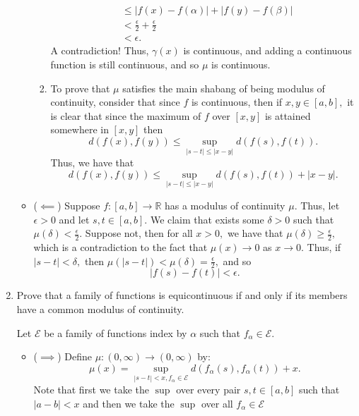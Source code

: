 \documentclass[11pt]{article}
\newcommand{\bbR}{\mathbb{R}}
\begin{document}
\begin{enumerate}
\begin{solution}
\begin{itemize}
\begin{enumerate}
\begin{align*}
              &\leq |f(x) - f(\alpha)| + |f(y) - f(\beta)|\\
              &< \frac{\epsilon}{2} + \frac{\epsilon}{2}\\
              &< \epsilon.
            \end{align*}
            A contradiction! Thus, $\gamma(x)$ is continuous, and adding a continuous function is still continuous, and so $\mu$ is continuous.
            \item To prove that $\mu$ satisfies the main shabang of being modulus of continuity, consider that since $f$ is continuous, then if $x,y \in [a,b],$ it is clear that since the maximum of $f$ over $[x,y]$ is attained somewhere in $[x,y]$ then
            \[d(f(x), f(y)) \leq \sup_{|s-t|\leq |x-y|}d(f(s), f(t)).\] Thus, we have that 
            \[d(f(x), f(y)) \leq \sup_{|s-t|\leq |x-y|}d(f(s), f(t)) + |x-y|.\] 
            \end{enumerate}
            \item ($\impliedby$) Suppose $f:[a,b] \to \bbR$ has a modulus of continuity $\mu.$ Thus, let $\epsilon>0$ and let $s,t \in [a,b].$ We claim that exists some $\delta >0$ such that $\mu(\delta) < \frac{\epsilon}{2}.$ Suppose not, then for all $x>0,$ we have that $\mu(\delta)\geq \frac{\epsilon}{2},$ which is a contradiction to the fact that $\mu(x) \to 0$ as $x\to 0.$ Thus, if $|s-t|<\delta,$ then $\mu(|s-t|)<\mu(\delta) = \frac{\epsilon}{2},$ and so 
            \[|f(s) - f(t)| < \epsilon.\]
        \end{itemize}
    \end{solution}
    \item 
    \begin{problem}
        Prove that a family of functions is equicontinuous if and only if its members
 have a common modulus of continuity.
    \end{problem}
    \begin{solution}
    Let $\mathcal{E}$ be a family of functions index by $\alpha$ such that $f_\alpha \in \mathcal{E}.$
        \begin{itemize}
            \item ($\implies$)  Define $\mu:(0,\infty) \to (0, \infty)$ by:
            \[\mu(x) = 
                \sup\limits_{|s-t|<x, f_\alpha \in \mathcal{E}}d(f_\alpha(s), f_\alpha(t)) + x.\] Note that first we take the $\sup$ over every pair $s,t \in [a,b]$ such that $|a-b|< x$ and then we take the $\sup$ over all $f_\alpha \in \mathcal{E}$
            \begin{enumerate}

\end{enumerate}
\end{itemize}
\end{solution}
\end{enumerate}
\end{document}
